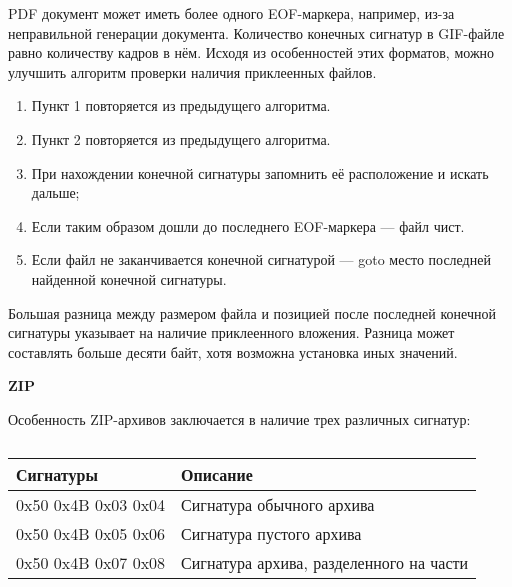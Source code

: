PDF документ может иметь более одного EOF-маркера, например, из-за
неправильной генерации документа. Количество конечных сигнатур в GIF-файле
равно количеству кадров в нём. Исходя из особенностей этих форматов, можно
улучшить алгоритм проверки наличия приклеенных файлов.
\begin{enumerate}
  \item Пункт 1 повторяется из предыдущего алгоритма.
  \item Пункт 2 повторяется из предыдущего алгоритма.
  \item При нахождении конечной сигнатуры запомнить её расположение и искать дальше;
  \item Если таким образом дошли до последнего EOF-маркера — файл чист.
  \item Если файл не заканчивается конечной сигнатурой — goto место последней найденной конечной сигнатуры.
\end{enumerate}

Большая разница между размером файла и позицией после последней конечной
сигнатуры указывает на наличие приклеенного вложения. Разница может
составлять больше десяти байт, хотя возможна установка иных значений.

\textbf{ZIP}

Особенность ZIP-архивов заключается в наличие трех различных сигнатур:

\begin{table} [htbp]%
  \centering
  \parbox{14cm}{%
    \captiondelim{ } %
    \caption{}%
    \label{tabl:tab7x3}%
    \begin{SingleSpace}
      \begin{tabular}{|l|l|}
      \hline
      Сигнатуры           & Описание                                \\ \hline
      0x50 0x4B 0x03 0x04 & Сигнатура обычного архива               \\ \hline
      0x50 0x4B 0x05 0x06 & Сигнатура пустого архива                \\ \hline
      0x50 0x4B 0x07 0x08 & Сигнатура архива, разделенного на части \\ \hline
      \end{tabular}
    \end{SingleSpace}
    }
\end{table}


